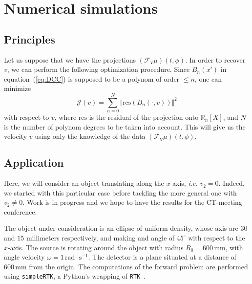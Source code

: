 \documentclass[twocolumn]{IEEEtran}
\numberwithin{equation}{section}
\newcommand{\R}{\mathbb{R}}
\newcommand{\ie}{\emph{i.e.} }
\newcommand{\Tbv}{\mathcal{F}_{\mathbf{v}}}
\begin{document}
\section{Numerical simulations}

\subsection{Principles}
\label{sub:principles}
Let us suppose that we have the projections $\left( \Tbv \mu \right)(t,\phi)$. In order to recover $v$, we can perform the following optimization procedure. Since $B_n(x')$ in equation~(\ref{eq:DCC}) is supposed to be a polynom of order $\leq n$, one can minimize
\begin{equation}
	\mathcal{J}(v) = \sum_{n=0}^N \Vert \textrm{res} \left( B_n(\cdot,v) \right) \Vert^2
\end{equation}
with respect to $v$, where $\textrm{res}$ is the residual of the projection onto $\R_n[X]$, and $N$ is the number of polynom degrees to be taken into account. This will give us the velocity $v$ using only the knowledge of the data $\left( \Tbv \mu \right)(t,\phi)$.

\subsection{Application}
\label{sub:application}
Here, we will consider an object translating along the $x$-axis, \ie $v_2=0$. Indeed, we started with this particular case before tackling the more general one with $v_2 \neq 0$. Work is in progress and we hope to have the results for the CT-meeting conference. 

The object under consideration is an ellipse of uniform density, whose axis are $30$ and $15$ millimeters respectively, and making and angle of $45^{\circ}$ with respect to the $x$-axis. The source is rotating around the object with radius $R_0 = 600 \, \textrm{mm}$, with angle velocity $\omega = 1 \, \textrm{rad} \cdot \textrm{s}^{-1}$. The detector is a plane situated at a distance of $600 \, \textrm{mm}$ from the origin. The computations of the forward problem are performed using \verb+simpleRTK+, a Python's wrapping of \verb+RTK+~\cite{RTK}.
\end{document}
